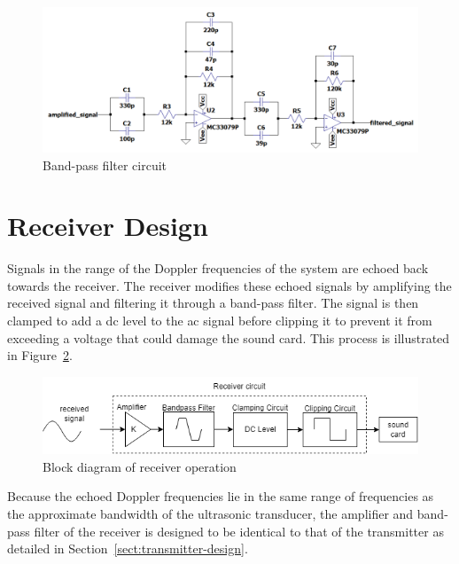\documentclass[class=report,11pt,crop=false]{standalone}
\begin{document}
\begin{figure}[htbp]
    \centering
    \includegraphics[width=1\columnwidth]{../Images/bandpass_filter.png}
    \caption{Band-pass filter circuit}
    \label{fig:bpf}
\end{figure}

\section{Receiver Design}
Signals in the range of the Doppler frequencies of the system are echoed back towards the receiver. The receiver modifies these echoed signals by amplifying the received signal and filtering it through a band-pass filter. The signal is then clamped to add a \gls{dc} level to the \gls{ac} signal before clipping it to prevent it from exceeding a voltage that could damage the sound card. This process is illustrated in Figure~\ref{fig:receiver-block}.

\begin{figure}[htbp]
    \centering
    \includegraphics[width=0.85\columnwidth]{../Images/receiver_block.drawio.png}
    \caption{Block diagram of receiver operation}
    \label{fig:receiver-block}
\end{figure}

Because the echoed Doppler frequencies lie in the same range of frequencies as the approximate bandwidth of the ultrasonic transducer, the amplifier and band-pass filter of the receiver is designed to be identical to that of the transmitter as detailed in Section~\ref{sect:transmitter-design}.
\end{document}
